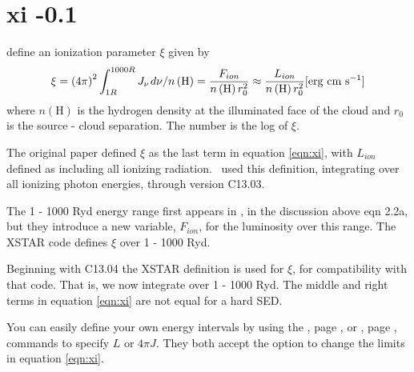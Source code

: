 \section{xi -0.1 }

\citet{Tarter1969, Krolik1981, 2001ApJS..133..221K} define an ionization parameter
$\xi$ given by
\begin{equation}
\xi  =  \left( {4\pi
} \right)^2 \int_{1R}^{1000R}  J_\nu  {\kern 1pt} d\nu /n\left( {\mathrm{H}}
\right)
= \frac{{F_{ion} }}{{n\left( {\mathrm{H}} \right)r_0^2 }}
\approx \frac{{L_{ion} }}{{n\left( {\mathrm{H}} \right)r_0^2 }}
 [\mathrm{erg\ cm\ s}^{-1}]
 \label{eqn:xi}
\end{equation}
where $n(\mathrm{H})$ is the hydrogen density at the illuminated face
of the cloud and $r_0$ is the source - cloud separation.
The number is the log of $\xi$.

The original \citet{Tarter1969} paper defined $\xi$ as the last term in equation \ref{eqn:xi}, 
with $L_{ion}$ defined as including all ionizing radiation.  
\Cloudy\ used this definition, integrating over all ionizing photon energies,
through version C13.03.  

The 1 - 1000 Ryd  energy range first appears in \citet{Krolik1981}, 
in the discussion above eqn 2.2a, 
but they introduce a new variable, $F_{ion}$, for the luminosity over this range.
The XSTAR code \citep{2001ApJS..133..221K} defines  $\xi$ over 1 - 1000 Ryd.

Beginning with C13.04 the XSTAR definition is used for $\xi$,
for compatibility with that code.
That is, we now integrate over 1 - 1000 Ryd.
The middle and right terms in equation \ref{eqn:xi} are not equal for a hard SED.

You can easily define your own energy intervals by using the ,
page \pageref{sec:LuminosityCommand},
or , page \pageref{sec:IntensityCommand}, commands to specify $L$ or $4\pi J$.
They both accept the  option to change the limits in equation \ref{eqn:xi}.

